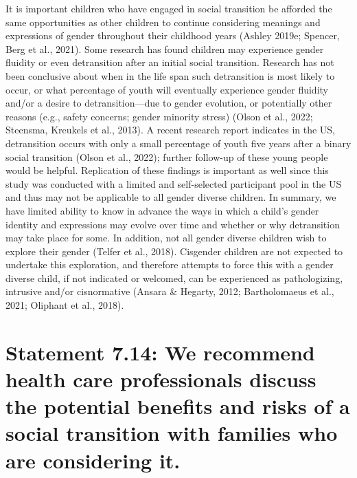 \documentclass[
]{book}
\begin{document}
It is important children who have engaged in
social transition be afforded the same opportunities as other children to continue considering
meanings and expressions of gender throughout
their childhood years (Ashley 2019e; Spencer,
Berg et al., 2021). Some research has found children may experience gender fluidity or even
detransition after an initial social transition.
Research has not been conclusive about when in
the life span such detransition is most likely to
occur, or what percentage of youth will eventually
experience gender fluidity and/or a desire to
detransition---due to gender evolution, or potentially other reasons (e.g., safety concerns; gender
minority stress) (Olson et al., 2022; Steensma,
Kreukels et al., 2013). A recent research report
indicates in the US, detransition occurs with only
a small percentage of youth five years after a
binary social transition (Olson et al., 2022); further follow-up of these young people would be
helpful. Replication of these findings is important
as well since this study was conducted with a
limited and self-selected participant pool in the
US and thus may not be applicable to all gender
diverse children. In summary, we have limited
ability to know in advance the ways in which a
child's gender identity and expressions may evolve
over time and whether or why detransition may
take place for some. In addition, not all gender
diverse children wish to explore their gender
(Telfer et al., 2018). Cisgender children are not
expected to undertake this exploration, and therefore attempts to force this with a gender diverse
child, if not indicated or welcomed, can be experienced as pathologizing, intrusive and/or cisnormative (Ansara \& Hegarty, 2012; Bartholomaeus
et al., 2021; Oliphant et al., 2018).

\hypertarget{statement-7.14-we-recommend-health-care-professionals-discuss-the-potential-benefits-and-risks-of-a-social-transition-with-families-who-are-considering-it.}{%
\section*{Statement 7.14: We recommend health care professionals discuss the potential benefits and risks of a social transition with families who are considering it.}\label{statement-7.14-we-recommend-health-care-professionals-discuss-the-potential-benefits-and-risks-of-a-social-transition-with-families-who-are-considering-it.}}
\end{document}
